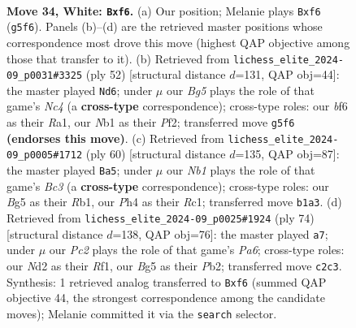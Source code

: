 \documentclass[11pt]{article}
\begin{document}
\clearpage

\begin{figure}[p]\centering
\begin{subfigure}{0.46\textwidth}\centering
\resizebox{\linewidth}{!}{%
\newchessgame
\chessboard[
  setfen={r1b2r2/pp3p1k/n4bp1/q2p2Bp/B5PP/1P6/R1PNQP2/1N2R1K1 w - - 0 34},
  showmover=false,
  pgfstyle=straightmove, color=movearrow, markmove={g5-f6}
]}
\caption{}
\end{subfigure}\hfill
\begin{subfigure}{0.46\textwidth}\centering
\resizebox{\linewidth}{!}{%
\newchessgame
\chessboard[
  setfen={1r4k1/rq1n1pp1/4p2p/2p4b/PbNP3P/3B1N2/1P2QPP1/R1R3K1 w - - 0 27},
  showmover=false,
  pgfstyle=straightmove, color=movearrow, markmove={c4-d6}
]}
\caption{}
\end{subfigure}
\\[4pt]
\begin{subfigure}{0.46\textwidth}\centering
\resizebox{\linewidth}{!}{%
\newchessgame
\chessboard[
  setfen={4rbk1/3q1p2/br4pp/1N1p4/Q2Pp3/2B1PnP1/5P1P/1RR2B1K w - - 8 31},
  showmover=false,
  pgfstyle=straightmove, color=movearrow, markmove={c3-a5}
]}
\caption{}
\end{subfigure}\hfill
\begin{subfigure}{0.46\textwidth}\centering
\resizebox{\linewidth}{!}{%
\newchessgame
\chessboard[
  setfen={1r3b1k/8/PN1pn2r/1Q1Np1pp/4Pp2/2P2P1q/1P3R1B/5R1K w - - 0 38},
  showmover=false,
  pgfstyle=straightmove, color=movearrow, markmove={a6-a7}
]}
\caption{}
\end{subfigure}
\caption{\textbf{Move 34, White: \texttt{Bxf6}.} (a) Our position; Melanie plays \texttt{Bxf6} (\texttt{g5f6}). Panels (b)--(d) are the retrieved master positions whose correspondence most drove this move (highest QAP objective among those that transfer to it). (b) Retrieved from \texttt{lichess\_elite\_2024-09\_p0031\#3325} (ply 52) [structural distance $d$=131, QAP obj=44]: the master played \texttt{Nd6}; under $\mu$ our \emph{Bg5} plays the role of that game's \emph{Nc4} (a \textbf{cross-type} correspondence); cross-type roles: our \emph{b}f6 as their \emph{R}a1, our \emph{N}b1 as their \emph{P}f2; transferred move \texttt{g5f6} \textbf{(endorses this move)}. (c) Retrieved from \texttt{lichess\_elite\_2024-09\_p0005\#1712} (ply 60) [structural distance $d$=135, QAP obj=87]: the master played \texttt{Ba5}; under $\mu$ our \emph{Nb1} plays the role of that game's \emph{Bc3} (a \textbf{cross-type} correspondence); cross-type roles: our \emph{B}g5 as their \emph{R}b1, our \emph{P}h4 as their \emph{R}c1; transferred move \texttt{b1a3}. (d) Retrieved from \texttt{lichess\_elite\_2024-09\_p0025\#1924} (ply 74) [structural distance $d$=138, QAP obj=76]: the master played \texttt{a7}; under $\mu$ our \emph{Pc2} plays the role of that game's \emph{Pa6}; cross-type roles: our \emph{N}d2 as their \emph{R}f1, our \emph{B}g5 as their \emph{P}b2; transferred move \texttt{c2c3}. Synthesis: 1 retrieved analog transferred to \texttt{Bxf6} (summed QAP objective 44, the strongest correspondence among the candidate moves); Melanie committed it via the \texttt{search} selector.}
\label{fig:thought-m66}
\end{figure}
\end{document}
